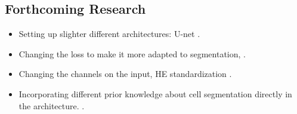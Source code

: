 \documentclass[a0,portrait]{a0poster}
\begin{document}
\begin{multicols}{2}



\section*{Forthcoming Research}

\color{SaddleBrown} %

\begin{itemize}
\item Setting up slighter different architectures: U-net \cite{UNet}.
\item Changing the loss to make it more adapted to segmentation, \cite{UNet}.
\item Changing the channels on the input, HE standardization \cite{deconvolution}.
\item Incorporating different prior knowledge about cell segmentation directly in the architecture. \cite{ranefall2016fast}.
\end{itemize}

\color{DarkSlateGray} %

\begin{small}


%

\end{small}

\end{multicols}
\end{document}
